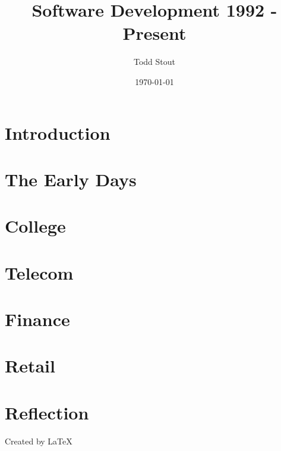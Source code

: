 \documentclass[12pt]{book}
\begin{document}
\title{Software Development 1992 - Present}
\author{Todd Stout}
\date{\today}

\maketitle

\tableofcontents

\chapter{Introduction}


\chapter{The Early Days}


\chapter{College}


\chapter{Telecom}


\chapter{Finance}


\chapter{Retail}


\chapter{Reflection}


Created by \LaTeX\
	
\end{document}
